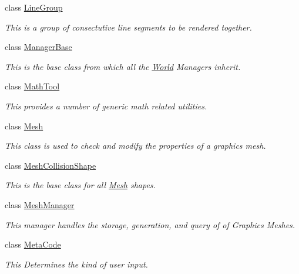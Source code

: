 \begin{DoxyCompactItemize}
class \hyperlink{classphys_1_1LineGroup}{LineGroup}
\begin{DoxyCompactList}\small\item\em This is a group of consectutive line segments to be rendered together. \item\end{DoxyCompactList}\item 
class \hyperlink{classphys_1_1ManagerBase}{ManagerBase}
\begin{DoxyCompactList}\small\item\em This is the base class from which all the \hyperlink{classphys_1_1World}{World} Managers inherit. \item\end{DoxyCompactList}\item 
class \hyperlink{classphys_1_1MathTool}{MathTool}
\begin{DoxyCompactList}\small\item\em This provides a number of generic math related utilities. \item\end{DoxyCompactList}\item 
class \hyperlink{classphys_1_1Mesh}{Mesh}
\begin{DoxyCompactList}\small\item\em This class is used to check and modify the properties of a graphics mesh. \item\end{DoxyCompactList}\item 
class \hyperlink{classphys_1_1MeshCollisionShape}{MeshCollisionShape}
\begin{DoxyCompactList}\small\item\em This is the base class for all \hyperlink{classphys_1_1Mesh}{Mesh} shapes. \item\end{DoxyCompactList}\item 
class \hyperlink{classphys_1_1MeshManager}{MeshManager}
\begin{DoxyCompactList}\small\item\em This manager handles the storage, generation, and query of of Graphics Meshes. \item\end{DoxyCompactList}\item 
class \hyperlink{classphys_1_1MetaCode}{MetaCode}
\begin{DoxyCompactList}\small\item\em This Determines the kind of user input. \item\end{DoxyCompactList}\item 

\end{DoxyCompactItemize}
